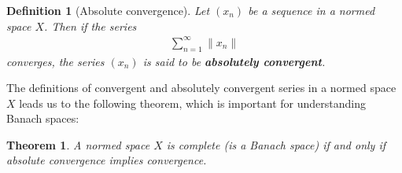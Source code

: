 \documentclass[11pt]{article}
\theoremstyle{mystyle}
\newtheorem{thm}{Theorem}[section]
\newtheorem{defn}{Definition}[section]
\newcommand{\0}{\mathbf{0}}
\begin{document}
\begin{defn}[Absolute convergence]
Let $(x_n)$ be a sequence in a normed space $X$. Then if the series
\begin{align*}
    \sum_{n=1}^{\infty} \| x_n\|
\end{align*}
converges, the series $(x_n)$ is said to be \textbf{absolutely convergent}.
\end{defn}

The definitions of convergent and absolutely convergent series in a normed space $X$ leads us to the following theorem, which is important for understanding Banach spaces:
\begin{thm}\label{banachabsoluteconvergence}
A normed space $X$ is complete (is a Banach space) if and only if absolute convergence implies convergence.
\end{thm}
\end{document}
